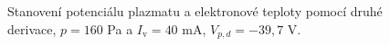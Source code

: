 \documentclass[a4paper,12pt]{article}
\begin{document}
\begin{figure}[h]
	\centering
	\begin{subfigure}[b]{.49\textwidth}
		\centering
	\end{subfigure}
	\begin{subfigure}[b]{.49\textwidth}
		\centering
	\end{subfigure}
	\caption{Stanovení potenciálu plazmatu a elektronové teploty pomocí druhé 
	derivace, $p = 160$ 
	\si{\pascal} a 
		$I_\text{v} = 40$ \si{\milli\ampere}, $V_{p,d} = -39,7$ V.}
	\label{data0sec}
\end{figure}
\end{document}
